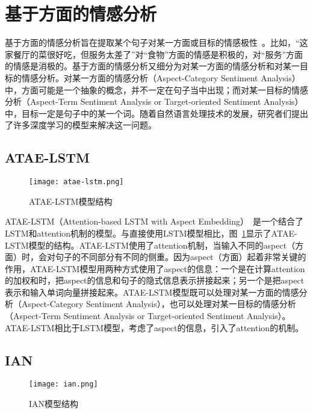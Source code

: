 \section{基于方面的情感分析}

基于方面的情感分析旨在提取某个句子对某一方面或目标的情感极性~\cite{pontiki2014semeval-2014}。比如，“这家餐厅的菜很好吃，但服务太差了”对“食物”方面的情感是积极的，对“服务”方面的情感是消极的。基于方面的情感分析又细分为对某一方面的情感分析和对某一目标的情感分析。对某一方面的情感分析（Aspect-Category Sentiment Analysis）中，方面可能是一个抽象的概念，并不一定在句子当中出现；而对某一目标的情感分析（Aspect-Term Sentiment Analysis or Target-oriented Sentiment Analysis）中，目标一定是句子中的某一个词。随着自然语言处理技术的发展，研究者们提出了许多深度学习的模型来解决这一问题。

\subsection{ATAE-LSTM}

\begin{figure}[ht]
    \centering 
    \texttt{[image: atae-lstm.png]}
    \caption{ATAE-LSTM模型结构}
    \label{fig:atae-lstm}
\end{figure}

ATAE-LSTM（Attention-based LSTM with Aspect Embedding）~\cite{wang2016attention-based}是一个结合了LSTM\cite{hochreiter1997long}和attention机制的模型。与直接使用LSTM模型相比，图~\ref{fig:atae-lstm}显示了ATAE-LSTM模型的结构。ATAE-LSTM使用了attention机制，当输入不同的aspect（方面）时，会对句子的不同部分有不同的侧重。因为aspect（方面）起着非常关键的作用，ATAE-LSTM模型用两种方式使用了aspect的信息：一个是在计算attention的加权和时，把aspect的信息和句子的隐式信息表示拼接起来；另一个是把aspect表示和输入单词向量拼接起来。ATAE-LSTM模型既可以处理对某一方面的情感分析（Aspect-Category Sentiment Analysis），也可以处理对某一目标的情感分析（Aspect-Term Sentiment Analysis or Target-oriented Sentiment Analysis）。ATAE-LSTM相比于LSTM模型，考虑了aspect的信息，引入了attention的机制。

\subsection{IAN}

\begin{figure}[ht]
    \centering
    \texttt{[image: ian.png]}
    \caption{IAN模型结构}
    \label{fig:ian}
\end{figure}

